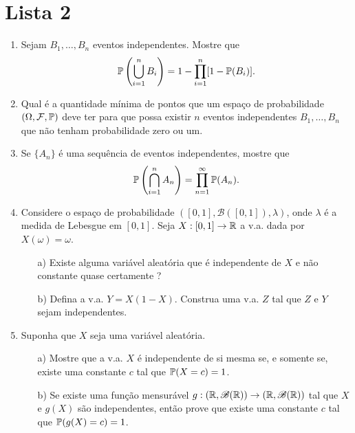 \chapter*{Lista 2}
\chaptermark{}


\begin{enumerate}[leftmargin=*]


\item 
Sejam $B_1,\ldots, B_n$ eventos independentes. 
Mostre que 
	\[
		\P \left( \bigcup_{i=1}^n B_i \right)
		=
		1- \prod_{i=1}^n [1-\P(B_i)].
	\]


\item 
Qual é a quantidade mínima de pontos que um espaço de
probabilidade $(\Omega,\F,\P)$ deve ter para que possa
existir $n$ eventos independentes $B_1,\ldots,B_n$ 
que não tenham probabilidade zero ou um. 


\item Se $\{A_n\}$ é uma sequência de eventos independentes,
mostre que 
	\[
		\P \left( \bigcap_{i=1}^n A_n \right)
		=
		\prod_{n=1}^{\infty} \P(A_n).
	\]



\item 
Considere o espaço de probabilidade $([0,1],\mathscr{B}([0,1]),\lambda)$,
onde $\lambda$ é a medida de Lebesgue em $[0,1]$.
Seja $X:[0,1]\to\R$ a v.a. dada por $X(\omega)=\omega$.
	\begin{itemize}
		\item[a)]
		Existe alguma variável aleatória que é independente de 
		$X$ e não constante quase certamente ?
		
		\item[b)] Defina a v.a. $Y=X(1-X)$. Construa uma v.a.
		$Z$ tal que $Z$ e $Y$ sejam independentes.
	\end{itemize}



\item 
Suponha que $X$ seja uma variável aleatória.
	\begin{itemize}
		\item[a)] 
		Mostre que a v.a. $X$ é independente de si mesma 
		se, e somente se, existe uma constante $c$ tal que 
		$\P(X=c)=1$.
		
		\item[b)]
		Se existe uma função mensurável 
		$g:(\R,\mathscr{B}(\R))\to(\R,\mathscr{B}(\R))$
		tal que $X$ e $g(X)$ são independentes, então prove que
		existe uma constante $c$ tal que $\P(g(X)=c)= 1$. 				
	\end{itemize}	 
		

\end{enumerate}
